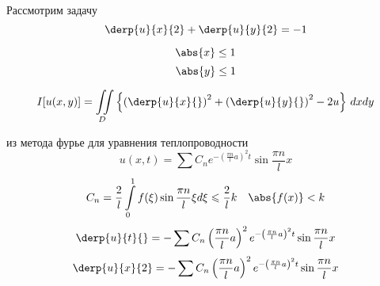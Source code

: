 Рассмотрим задачу 
\[ \derp{u}{x}{2} + \derp{u}{y}{2} = -1 \]

\[ \abs{x} \leq 1 \]
\[ \abs{y} \leq 1 \]

\[ I[u(x, y)] = \iint\limits_D \left\{ \left(\derp{u}{x}{} \right)^2 + \left(\derp{u}{y}{} \right)^2 - 2 u \right\}\, dx dy \]

из метода фурье для уравнения теплопроводности
\[u(x, t) = \sum C_n e^{- \left( \frac{\pi n}{l} a\right)^2 t} \sin \frac{\pi n}{l} x\]
	\[C_n = \frac{2}{l} \int\limits_{0}^{1} f (\xi) \sin \frac{\pi n}{l} \xi d \xi \leqslant \frac{2}{l} k \quad \abs{f(x)} < k\]
	\[\derp{u}{t}{} = - \sum C_n \left( \frac{\pi n}{l} a\right)^2 e^{- \left( \frac{\pi n}{l} a\right)^2 t} \sin \frac{\pi n}{l} x\]
	\[\derp{u}{x}{2} = - \sum C_n \left( \frac{\pi n}{l} a\right)^2 e^{- \left( \frac{\pi n}{l} a\right)^2 t} \sin \frac{\pi n}{l} x\]